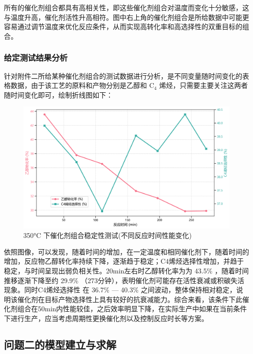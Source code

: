 \newpage

所有的催化剂组合都具有高相关性，即这些催化剂组合对温度而变化十分敏感，这与温度升高，催化剂活性升高相符。图中右上角的催化剂组合是所给数据中可能更容易通过调节温度来优化反应条件，从而实现高转化率和高选择性的双重目标的组合。

\subsubsection{给定测试结果分析}
针对附件二所给某种催化剂组合的测试数据进行分析，是不同变量随时间变化的表格数据，由于该工艺的原料和产物分别是乙醇和 \( \text{C}_4 \) 烯烃，只需要主要关注这两者随时间变化即可，绘制折线图如下：

\begin{figure}[h]%
	\centering%
	\includegraphics [scale=0.6]{图/1-2-1.png}
	\caption{350°C 下催化剂组合稳定性测试(不同反应时间性能变化)} 
	\label{fig:1}
\end{figure}

\newpage

依照图像，可以发现，随着时间的增加，在一定温度和相同催化剂下，随着时间的增加，反应物乙醇转化率持续下降，逐渐趋于稳定；C4烯烃选择性增加，并趋于稳定，与时间呈现出弱负相关性。20min左右时乙醇转化率为为 43.5\% ，随着时间推移逐渐下降至约 29.9\% （273分钟），表明催化剂可能存在活性衰减或积碳失活现象。同时C4烯烃选择性 在 36.7\% — 40.3\% 之间波动，整体保持相对稳定，说明该催化剂在目标产物选择性上具有较好的抗衰减能力。综合来看，该条件下此催化剂组合在50min内性能较佳，之后效率明显下降，在实际生产中如果在当前条件下进行生产，应当考虑周期性更换催化剂以及控制反应时长等方案。


\subsection{问题二的模型建立与求解}
